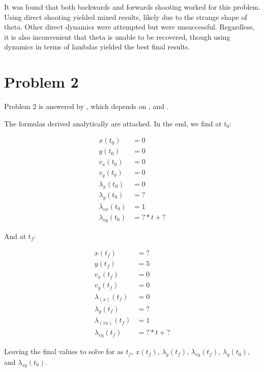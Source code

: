 \documentclass[12pt,letterpaper]{article}
\begin{document}
It was found that both backwards and forwards shooting worked for this problem. Using direct shooting yielded mixed results, likely due to the strange shape of theta. Other direct dynamics were attempted but were unsuccessful. Regardless, it is also inconvenient that theta is unable to be recovered, though using dynamics in terms of lambdas yielded the best final results.





\section*{Problem 2}

Problem 2 is answered by , which depends on , and . 

The formulas derived analytically are attached. In the end, we find at $t_0$:

\begin{equation}
\begin{aligned}
\label{eq:2}
x(t_0) &= 0 \\
y(t_0) &= 0 \\
v_x(t_0) &= 0 \\
v_y(t_0) &= 0 \\
\lambda_x(t_0) &= 0 \\
\lambda_y(t_0) &= ? \\
\lambda_{vx}(t_0) &= 1 \\
\lambda_{vy}(t_0) &= ?*t + ? 
\end{aligned}
\end{equation}

And at $t_f$:

\begin{equation}
\begin{aligned}
\label{eq:2}
x(t_f) &= ? \\
y(t_f) &= 5 \\
v_x(t_f) &= 0 \\
v_y(t_f) &= 0 \\
\lambda_(x)(t_f) &= 0\\
\lambda_{y}(t_f) &= ? \\ 
\lambda_(vx)(t_f) &= 1 \\
\lambda_{vy}(t_f) &= ?*t + ? 
\end{aligned}
\end{equation}

Leaving the final values to solve for as $t_f$, $x(t_f)$, $\lambda_y(t_f)$, $\lambda_{vy}(t_f)$, $\lambda_y(t_0)$, and $\lambda_{vy}(t_0)$.
\end{document}
